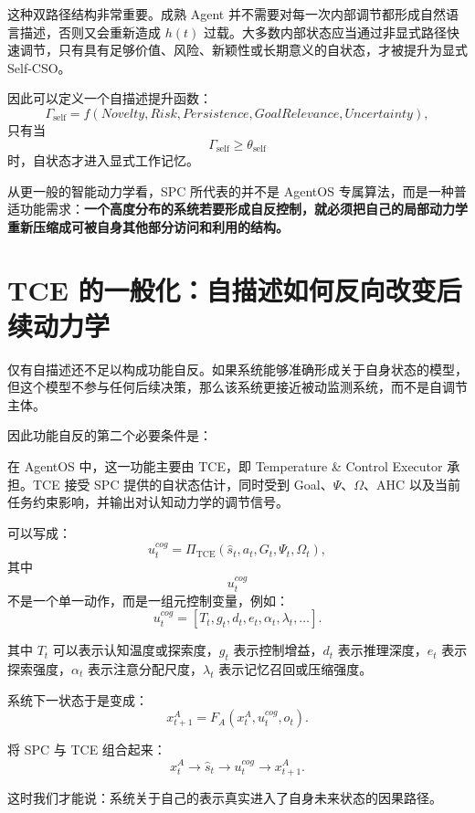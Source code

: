 这种双路径结构非常重要。成熟 Agent 并不需要对每一次内部调节都形成自然语言描述，否则又会重新造成 \(h(t)\) 过载。大多数内部状态应当通过非显式路径快速调节，只有具有足够价值、风险、新颖性或长期意义的自状态，才被提升为显式 Self-CSO。

因此可以定义一个自描述提升函数：
\[
\Gamma_{\mathrm{self}}
=
f(
Novelty,
Risk,
Persistence,
GoalRelevance,
Uncertainty
),
\]
只有当
\[
\Gamma_{\mathrm{self}}
\geq
\theta_{\mathrm{self}}
\]
时，自状态才进入显式工作记忆。

从更一般的智能动力学看，SPC 所代表的并不是 AgentOS 专属算法，而是一种普适功能需求：\textbf{一个高度分布的系统若要形成自反控制，就必须把自己的局部动力学重新压缩成可被自身其他部分访问和利用的结构。}

\section{TCE 的一般化：自描述如何反向改变后续动力学}

仅有自描述还不足以构成功能自反。如果系统能够准确形成关于自身状态的模型，但这个模型不参与任何后续决策，那么该系统更接近被动监测系统，而不是自调节主体。

因此功能自反的第二个必要条件是：
\begin{statementbox}
\centering
{}
\end{statementbox}

在 AgentOS 中，这一功能主要由 TCE，即 Temperature \& Control Executor 承担。TCE 接受 SPC 提供的自状态估计，同时受到 Goal、\(\Psi\)、\(\Omega\)、AHC 以及当前任务约束影响，并输出对认知动力学的调节信号。

可以写成：
\[
u_t^{cog}
=
\Pi_{\mathrm{TCE}}
\left(
\hat s_t,
a_t,
G_t,
\Psi_t,
\Omega_t
\right),
\]
其中
\[
u_t^{cog}
\]
不是一个单一动作，而是一组元控制变量，例如：
\[
u_t^{cog}
=
[
T_t,
g_t,
d_t,
e_t,
\alpha_t,
\lambda_t,
\ldots
].
\]

其中 \(T_t\) 可以表示认知温度或探索度，\(g_t\) 表示控制增益，\(d_t\) 表示推理深度，\(e_t\) 表示探索强度，\(\alpha_t\) 表示注意分配尺度，\(\lambda_t\) 表示记忆召回或压缩强度。

系统下一状态于是变成：
\[
x_{t+1}^A
=
F_A
\left(
x_t^A,
u_t^{cog},
o_t
\right).
\]

将 SPC 与 TCE 组合起来：
\[
x_t^A
\rightarrow
\hat s_t
\rightarrow
u_t^{cog}
\rightarrow
x_{t+1}^A.
\]

这时我们才能说：系统关于自己的表示真实进入了自身未来状态的因果路径。

